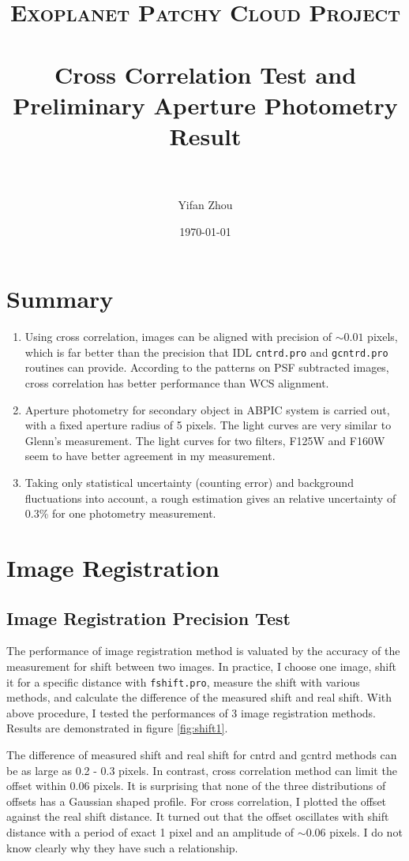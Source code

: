 \documentclass[paper=letter, fontsize=11pt]{scrartcl} %
\title{ 
\normalfont \normalsize 
\textsc{Exoplanet Patchy Cloud Project} \\ [25pt] %
\horrule{0.5pt} \\[0.4cm] %
\huge Cross Correlation Test and Preliminary Aperture Photometry Result\\ %
\horrule{2pt} \\[0.5cm] %
}
\author{Yifan Zhou} %
\date{\normalsize\today} %
\numberwithin{equation}{section} %
\numberwithin{figure}{section} %
\numberwithin{table}{section} %
\begin{document}
\maketitle %
\section{Summary}
\begin{enumerate}
\item Using cross correlation, images can be aligned with precision of
  $\sim 0.01$ pixels, which is far better than the precision that IDL
  \texttt{cntrd.pro} and \texttt{gcntrd.pro} routines can
  provide. According to the patterns on PSF subtracted images, cross
  correlation has better performance than WCS alignment.
\item Aperture photometry for secondary object in ABPIC system is
  carried out, with a fixed aperture radius of 5 pixels. The light
  curves are very similar to Glenn's measurement. The light curves for
  two filters, F125W and F160W seem to have better agreement in my
  measurement.
\item Taking only statistical uncertainty (counting error) and
  background fluctuations into account, a rough estimation gives an
  relative uncertainty of 0.3\% for one photometry measurement.
  
\end{enumerate}
\section{Image Registration}
\subsection{Image Registration Precision Test}
The performance of image registration method is valuated by the
accuracy of the measurement for shift between two images. In practice,
I choose one image, shift it for a specific distance with
\texttt{fshift.pro}, measure the shift with various methods, and
calculate the difference of the measured shift and real shift. With
above procedure, I tested the performances of 3 image registration
methods. Results are demonstrated in figure \ref{fig:shift1}.\par

The difference of measured shift and real shift  for cntrd and gcntrd methods can be as large as 0.2 - 0.3
pixels. In contrast, cross correlation method can limit the offset within
0.06 pixels. It is surprising that none of the three distributions of
offsets has a Gaussian shaped  profile. For cross correlation, I plotted
the offset against the real shift distance. It turned out that the
offset oscillates with shift distance with a period of exact 1 pixel
and an amplitude of $\sim$0.06 pixels. I do not know clearly why they have
such a relationship.\par
\end{document}
